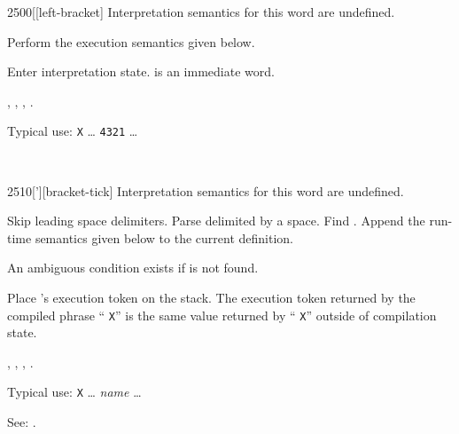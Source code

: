\begin{worddef}{2500}{[}[left-bracket]
\interpret
	Interpretation semantics for this word are undefined.

\compile
	Perform the execution semantics given below.

\execute
	\stack{}{}

	Enter interpretation state. \word{[} is an immediate word.

\see {},
	,
	\wref{core:]}{]},
	\rref{core:[}{}.

	\begin{rationale} %
		Typical use:
			\word{:} \texttt{X} {\ldots}
				\word{[} \texttt{4321} \word{]} 
				{\ldots} \word{;}
	\end{rationale}

	\begin{testing} %
		 \\
	\end{testing}
\end{worddef}


\begin{worddef}{2510}{[']}[bracket-tick]
\interpret
	Interpretation semantics for this word are undefined.

\compile

	Skip leading space delimiters. Parse  delimited by
	a space. Find . Append the run-time semantics given
	below to the current definition.

	An ambiguous condition exists if  is not found.

\runtime

	Place 's execution token  on the stack.
	The execution token returned by the compiled phrase
	``\word{[']} \texttt{X}'' is the same value returned by
	`` \texttt{X}'' outside of compilation state.

\see {},
	,
	,\newline
	.

	\begin{rationale} %
		Typical use:
			\word{:} \texttt{X} {\ldots}
				\word{[']} \emph{name}
				{\ldots} \word{;}

		See:
			.
	\end{rationale}

	\begin{testing} %
		 \\
	\end{testing}
\end{worddef}


